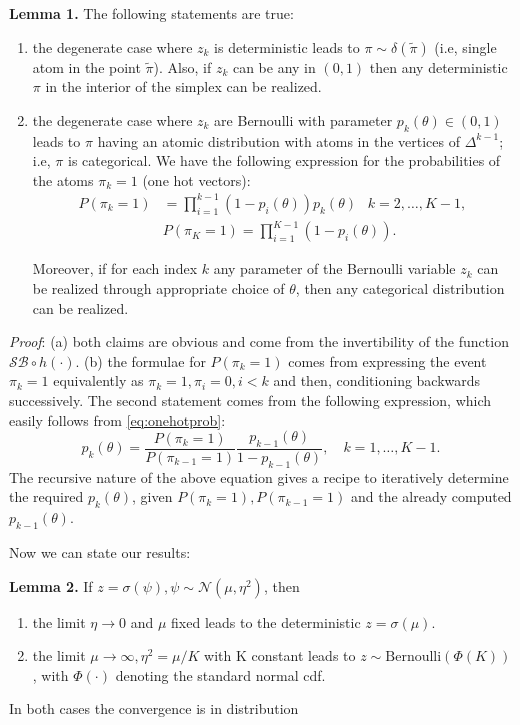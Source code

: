 \documentclass[twoside]{article}
\begin{document}
\textbf{Lemma 1.}  The following statements are true:
\begin{enumerate} \item the degenerate case where  $z_k$ is deterministic leads to $\pi\sim \delta(\tilde{\pi})$  (i.e, single atom in the point $\tilde{\pi}$). Also, if $z_k$ can be any in $(0,1)$ then any deterministic $\pi$ in the interior of the simplex can be realized.
\item the degenerate case where  $z_k$ are Bernoulli with parameter $p_k(\theta) \in (0,1)$ leads to $\pi$ having an atomic distribution with atoms in the vertices of $\Delta^{k-1}$; i.e, $\pi$ is categorical. We have the following expression for the probabilities of the atoms $\pi_k=1$ (one hot vectors):
\begin{align}
\label{eq:onehotprob}
\nonumber P(\pi_k =1)&= \prod_{i=1}^{k-1} (1-p_i(\theta)) p_k(\theta)  \;\; \ k=2, \ldots, K-1,\\  \nonumber & P(\pi_K =1) = \prod_{i=1}^{K-1} (1-p_i(\theta)).
\end{align}

Moreover, if for each index $k$ any parameter of the Bernoulli variable $z_k$ can be realized through appropriate choice of $\theta$, then any categorical distribution can be realized.

\end{enumerate}
\textit{Proof}: (a) both claims are obvious and come from the invertibility of the function $\mathcal{SB} \circ h (\cdot)$. (b) the formulae for $P(\pi_k =1)$ comes from expressing the event $\pi_k=1$ equivalently as $\pi_k=1,\pi_i=0, i<k$ and then, conditioning backwards successively. The second statement comes from the following expression, which easily follows  from \eqref{eq:onehotprob}:
$$ p_k(\theta)=\frac{P(\pi_k =1)}{P(\pi_{k-1} =1)}\frac{p_{k-1}(\theta)}{1-p_{k-1}(\theta)},\quad k =1,\ldots, K-1.$$
The recursive nature of the above equation gives a recipe to iteratively determine the required $p_k(\theta)$, given  $P(\pi_k =1), P(\pi_{k-1} =1)$ and the already computed $p_{k-1}(\theta)$.


Now we can state our results:

\textbf{Lemma 2.} If $z=\sigma(\psi),\psi\sim\mathcal{N}(\mu,\eta^2)$, then
\begin{enumerate} \item the  limit $\eta\rightarrow 0$ and $\mu$ fixed leads to the deterministic $z=\sigma(\mu)$. 
\item the limit $\mu\rightarrow \infty, \eta^2=\mu/K$ with K constant leads to $z\sim \text{Bernoulli}(\Phi(K))$, with $\Phi(\cdot)$ denoting the standard normal cdf.
\end{enumerate} In both cases the convergence is in distribution 
\end{document}
